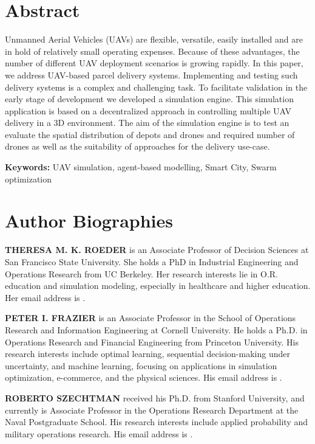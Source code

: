 \documentclass{scspaperproc}
\theoremstyle{scsthe}
\begin{document}
\section*{Abstract}
Unmanned Aerial Vehicles (UAVs) are flexible, versatile, easily installed and are in hold of relatively small operating expenses. Because of these advantages, the number of different UAV deployment scenarios is growing rapidly. In this paper, we address UAV-based parcel delivery systems. Implementing and testing such delivery systems is a complex and challenging task. To facilitate validation in the early stage of development we developed a simulation engine. This simulation application is based on a decentralized approach in controlling multiple UAV delivery in a 3D environment. The aim of the simulation engine is to test an evaluate the spatial distribution of depots and drones and required number of drones as well as the suitability of approaches for the delivery use-case.

\textbf{Keywords:} UAV simulation, agent-based modelling, Smart City, Swarm optimization






\section*{Author Biographies}

\textbf{\uppercase{THERESA M. K. ROEDER}} is an Associate Professor of Decision Sciences at San Francisco State University. She holds a PhD in Industrial Engineering and Operations Research from UC Berkeley. Her research interests lie in O.R. education and simulation modeling, especially in healthcare and higher education. Her email address is .

\textbf{\uppercase{PETER I. FRAZIER}} is an Associate Professor in the School of Operations Research and Information Engineering at Cornell University. He holds a Ph.D. in Operations Research and Financial Engineering from Princeton University. His research interests include optimal learning, sequential decision-making under uncertainty, and machine learning, focusing on applications in simulation optimization, e-commerce, and the physical sciences.  His email address is .

\textbf{\uppercase{ROBERTO SZECHTMAN}} received his Ph.D. from Stanford University, and currently is Associate Professor in the Operations Research Department at the Naval Postgraduate School. His research interests include applied probability and military operations research. His email address is .
\end{document}

